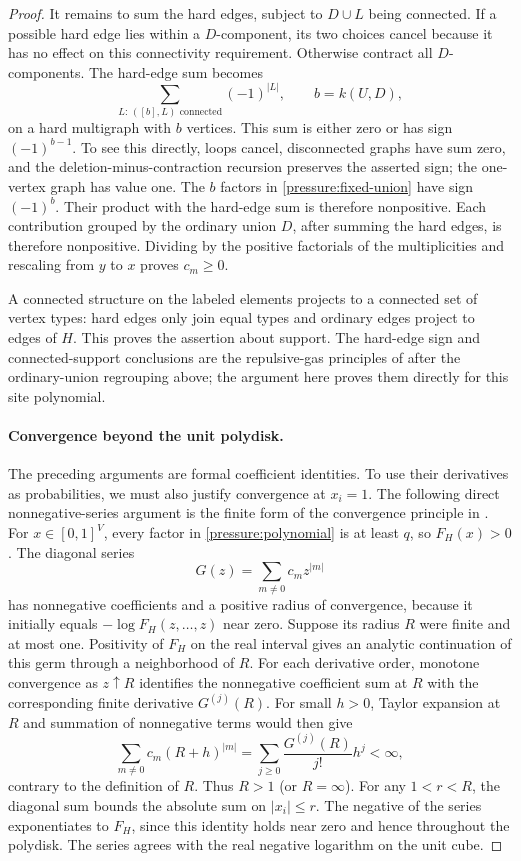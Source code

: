 \begin{proof}
It remains to sum the hard edges, subject to $D\cup L$ being connected.
If a possible hard edge lies within a $D$-component, its two choices
cancel because it has no effect on this connectivity requirement.
Otherwise contract all $D$-components. The hard-edge sum becomes
\[
 \sum_{L:\,([b],L)\text{ connected}}(-1)^{|L|},
 \qquad b=k(U,D),
\]
on a hard multigraph with $b$ vertices. This sum is either zero or has
sign $(-1)^{b-1}$. To see this directly, loops cancel, disconnected
graphs have sum zero, and the deletion-minus-contraction recursion
preserves the asserted sign; the one-vertex graph has value one.
The $b$ factors in \eqref{pressure:fixed-union} have sign $(-1)^b$.
Their product with the hard-edge sum is therefore nonpositive.
Each contribution grouped by the ordinary union $D$, after summing
the hard edges, is therefore nonpositive. Dividing by the positive
factorials of the multiplicities
and rescaling from $y$ to $x$ proves $c_m\ge0$.

A connected structure on the labeled elements projects to a connected
set of vertex types: hard edges only join equal types and ordinary
edges project to edges of $H$. This proves the assertion about support.
The hard-edge sign and connected-support conclusions are the
repulsive-gas principles of
\cite[Propositions~2.8--2.9]{ScottSokal2005RepulsiveGas} after the
ordinary-union regrouping above; the argument here proves them directly
for this site polynomial.

\paragraph{Convergence beyond the unit polydisk.}
The preceding arguments are formal coefficient identities. To use their
derivatives as probabilities, we must also justify convergence at
$x_i=1$. The following direct nonnegative-series argument is the finite form of
the convergence principle in \cite[Theorem~2.10]{ScottSokal2005RepulsiveGas}.
For $x\in[0,1]^V$, every factor in
\eqref{pressure:polynomial} is at least $q$, so $F_H(x)>0$.
The diagonal series
\[
 G(z)=\sum_{m\ne0}c_m z^{|m|}
\]
has nonnegative coefficients and a positive radius of convergence,
because it initially equals $-\log F_H(z,\ldots,z)$ near zero.
Suppose its radius $R$ were finite and at most one. Positivity of
$F_H$ on the real interval gives an analytic continuation of this
germ through a neighborhood of $R$. For each derivative order,
monotone convergence as $z\uparrow R$ identifies the nonnegative
coefficient sum at $R$ with the corresponding finite derivative
$G^{(j)}(R)$. For small $h>0$, Taylor expansion at $R$ and summation
of nonnegative terms would then give
\[
 \sum_{m\ne0}c_m(R+h)^{|m|}
   =\sum_{j\ge0}\frac{G^{(j)}(R)}{j!}h^j<\infty,
\]
contrary to the definition of $R$. Thus $R>1$ (or $R=\infty$).
For any $1<r<R$, the diagonal sum bounds the absolute sum on
$|x_i|\le r$. The negative of the series exponentiates to $F_H$, since this
identity holds near zero and hence throughout the polydisk.
The series agrees with the real negative logarithm on the unit cube.
\end{proof}

